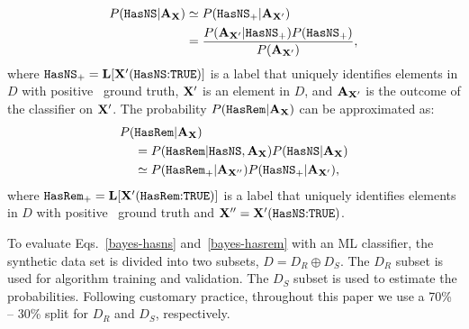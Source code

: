 \begin{align}
\label{bayes-hasns}
P({{\tt HasNS}}|{\bf A}_{\bf X})&\simeq P({{\tt HasNS}}_+|{\bf A}_{{\bf X}'}) \nonumber \\
&=\frac{P({\bf A}_{{\bf X}'}|{{\tt HasNS}}_+)P({{\tt HasNS}}_+)}{P({\bf A}_{{\bf X}'})},
\end{align}
where ${{\tt HasNS}}_+={\bf L}[{\bf X}'(\hbox{{{\tt HasNS}}:{{\tt TRUE}}})]$ is a label that uniquely identifies elements in $D$ with positive \hasns\ ground truth, ${\bf X}'$ is an element in $D$, and ${\bf A}_{{\bf X}'}$ is the outcome of the classifier on ${\bf X}'$. The probability $P({{\tt HasRem}}|{\bf A}_{\bf X})$ can be approximated as:
\begin{align}
\label{bayes-hasrem}
P(&{{\tt HasRem}}|{\bf A}_{\bf X}) \\
&=P({{\tt HasRem}}|{{\tt HasNS}}, {\bf A}_{\bf X})P({{\tt HasNS}}|{\bf A}_{\bf X}) \nonumber \\
&\simeq P({{\tt HasRem}}_+|{\bf A}_{{\bf X}''})P({{\tt HasNS}}_+|{\bf A}_{{\bf X}'}),
\end{align}
where ${{\tt HasRem}}_+={\bf L}[{\bf X}'(\hbox{{{\tt HasRem}}:{{\tt TRUE}}})]$ is a label that uniquely identifies elements in $D$ with positive \hasrem\ ground truth and ${\bf X}''= {\bf X}'(\hbox{{{\tt HasNS}}:{{\tt TRUE}}})$.

To evaluate Eqs.~\eqref{bayes-hasns} and~\eqref{bayes-hasrem} with an \ac{ML} classifier, the synthetic data set is divided into two subsets, $D=D_R\oplus D_S$. The $D_R$ subset is used for
algorithm training and validation. The $D_S$ subset is used to estimate the probabilities. Following customary practice, throughout this paper we use a 70\% -- 30\% split for $D_R$ and $D_S$,
respectively.

